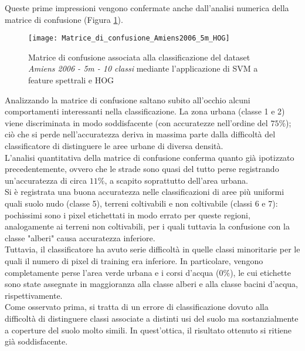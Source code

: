 Queste prime impressioni vengono confermate anche dall'analisi numerica della matrice di confusione (Figura
\ref{fig:Matrice_di_confusione_Amiens2006_5m_HOG}).

\begin{figure}[!ht]

\texttt{[image: Matrice\_di\_confusione\_Amiens2006\_5m\_HOG]}

\caption{Matrice di confusione associata alla classificazione del
dataset \emph{Amiens 2006 - 5m - 10 classi} mediante l'applicazione di SVM a feature spettrali e HOG}

\label{fig:Matrice_di_confusione_Amiens2006_5m_HOG}

\end{figure}

Analizzando la matrice di confusione saltano subito all'occhio alcuni
comportamenti interessanti nella classificazione. La zona urbana
(classe 1 e 2) viene discriminata in modo soddisfacente (con
accuratezze nell'ordine del $75\%$); ciò che si perde nell'accuratezza
deriva in massima parte dalla difficoltà del classificatore di
distinguere le aree urbane di diversa densità.\\

L'analisi quantitativa della matrice di confusione conferma quanto già
ipotizzato precedentemente, ovvero che le strade sono quasi del tutto
perse registrando un'accuratezza di circa $11\%$, a scapito soprattutto
dell'area urbana. \\

Si è registrata una buona accuratezza nelle classificazioni di aree
più uniformi quali suolo nudo (classe 5), terreni coltivabili e non
coltivabile (classi 6 e 7): pochissimi sono i pixel etichettati in
modo errato per queste regioni, analogamente ai terreni non
coltivabili, per i quali tuttavia la confusione con la classe "alberi"
causa accuratezza inferiore.\\

Tuttavia, il classificatore ha avuto serie difficoltà in quelle classi
minoritarie per le quali il numero di pixel di training era inferiore.
In particolare, vengono completamente perse l'area verde urbana e i
corsi d'acqua ($0\%$), le cui etichette sono state assegnate in
maggioranza alla classe alberi e alla classe bacini d'acqua,
rispettivamente.\\

Come osservato prima, si tratta di un errore di classificazione dovuto
alla difficoltà di distinguere classi associate a distinti usi del
suolo ma sostanzialmente a coperture del suolo molto simili. In
quest'ottica, il risultato ottenuto si ritiene già soddisfacente.\\

